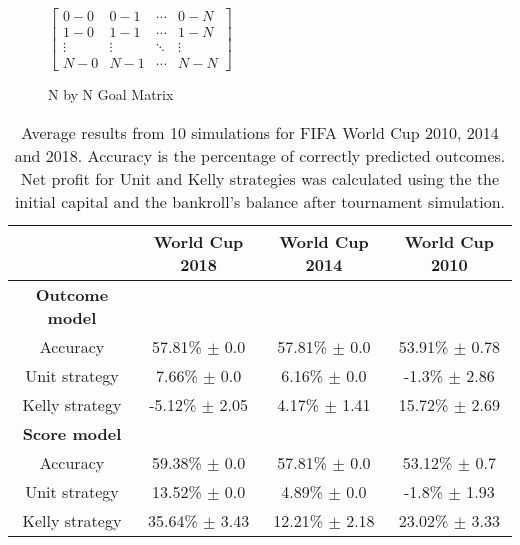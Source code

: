 

\begin{figure}
    $\begin{bmatrix}
    0-0 & 0-1 & \cdots & 0-N \\
    1-0 & 1-1 & \cdots   &1-N \\
    \vdots & \vdots   & \ddots & \vdots \\
    N-0 & N-1 & \cdots & N-N\end{bmatrix}$
\caption{N by N Goal Matrix}
\end{figure}

\begin{table}
    \caption{Average results from 10 simulations for FIFA World Cup 2010, 2014 and 2018. Accuracy is the percentage of correctly predicted outcomes. Net profit for Unit and Kelly strategies was calculated using the the initial capital and the bankroll's balance after tournament simulation.}
    \begin{tabular}{ | c |c| c | c |}
    \hline
    & World Cup 2018 & World Cup 2014 & World Cup 2010 \\
    \hline
    \textbf{Outcome model} \\
    \hline
    Accuracy & 57.81\% $\pm$ 0.0 & 57.81\% $\pm$ 0.0 & 53.91\% $\pm$ 0.78 \\
    Unit strategy& 7.66\% $\pm$ 0.0 & 6.16\% $\pm$ 0.0 & -1.3\% $\pm$ 2.86 \\
    Kelly strategy& -5.12\% $\pm$ 2.05 & 4.17\% $\pm$ 1.41 & 15.72\% $\pm$ 2.69 \\
    \hline
    \textbf{Score model} \\
    \hline
    Accuracy & 59.38\% $\pm$ 0.0 & 57.81\% $\pm$ 0.0 & 53.12\% $\pm$ 0.7 \\
    Unit strategy & 13.52\% $\pm$ 0.0 & 4.89\% $\pm$ 0.0 & -1.8\% $\pm$ 1.93 \\
    Kelly strategy & 35.64\% $\pm$ 3.43 & 12.21\% $\pm$ 2.18 & 23.02\% $\pm$ 3.33 \\
    \hline
   \end{tabular}
\end{table}


